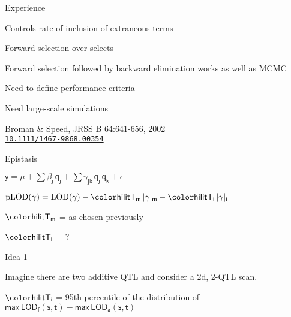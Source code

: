 \documentclass[aspectratio=169,12pt,t]{beamer}
\newcommand{\lod}{\text{LOD}}
\newcommand{\plod}{\text{pLOD}}
\begin{document}
\begin{frame}{Experience}

\bbi
\item Controls rate of inclusion of extraneous terms
\item Forward selection over-selects
\item {\vhilit Forward selection followed by backward elimination} works as well
  as MCMC
\item {\hilit Need to define performance criteria}
\item {\hilit Need large-scale simulations}
\ei

\bigskip \bigskip \bigskip

\footnotesize
\hfill Broman \& Speed, JRSS B 64:641-656, 2002 \\
\hfill \href{https://doi.org/10.1111/1467-9868.00354}{\tt 10.1111/1467-9868.00354}

\note{
}
\end{frame}







\begin{frame}{Epistasis}

\bigskip \bigskip \bigskip

\centerline{
$\mathsf{y  = \mu + \sum \beta_j \, q_j + \sum \gamma_{jk} \, q_j \,
    q_k + \epsilon}$
}

\bigskip \bigskip \bigskip

{\hilit
$\mathsf{ \plod(\gamma) = \lod(\gamma) -
    {\hilit T_m} \, |\gamma|_m - {\hilit T_i} \, |\gamma|_i }$
}


\bigskip \bigskip \bigskip

\hspace{3em} $\mathsf{\hilit T_m}$ = as chosen previously

\bigskip

\hspace{3em} $\mathsf{\hilit T_i}$ = ?

\note{
}
\end{frame}






\begin{frame}{Idea 1}


\hfill \begin{minipage}{10in}

Imagine there are two additive QTL and consider a 2d, 2-QTL scan.

\vspace{1cm}

\hspace*{0.5in} $\mathsf{\hilit T_i}$ = 95th percentile of the
  distribution of \\[6pt]
\hspace*{1.3in} {\lolit $\mathsf{ \text{max} \, \lod_f(s,t) -
    \text{max} \, \lod_a(s,t)}$}


\end{minipage}



\note{
}
\end{frame}
\end{document}

